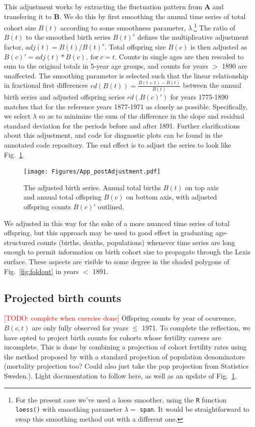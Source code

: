 \documentclass{article}
\renewcommand{\todo}[1]{\textcolor{red}{[TODO: #1]}}
\begin{document}
\begin{appendix}
This adjustment works by extracting the fluctuation pattern from \textbf{A} and transfering it to \textbf{B}. We do this by first smoothing the annual time series of total cohort size $B(t)$ according to some smoothness parameter, $\lambda$.\footnote{For the present case we've used a loess smoother, using the \texttt{R} function \texttt{loess()} with smoothing parameter $\lambda =$ \texttt{span}. It would be straightforward to swap this smoothing method out with a different one.} The ratio of $B(t)$ to the smoothed birth series $B(t)^s$ defines the multiplicative adjustment factor, $adj(t) = B(t)/B(t)^s$. Total offspring size $B(c)$ is then adjusted as $B(c)' = adj(t)*B(c), \mathrm{~for~} c = t$. Counts in single ages are then rescaled to sum to the original totals in 5-year age groups, and counts for years $>$ 1890 are unaffected. The smoothing parameter is selected such that the linear relationship in fractional first differences $rd(B(t)) = \frac{B(t+1)-B(t)}{B(t)}$ between the annual birth series and adjusted offspring series $rd(B(c)')$ for years 1775-1890 matches that for the reference years 1877-1971 as closely as possible. Specifically, we select $\lambda$ so as to minimize the sum of the difference in the slope and residual standard deviation for the periods before and after 1891. Further clarifications about this adjustment, and code for diagnostic plots can be found in the annotated code repository. The end effect is to adjust the series to look like Fig.~\ref{fig:better}.

\begin{figure}[ht!]
\centering
 \texttt{[image: Figures/App\_postAdjustment.pdf]}
\caption{The adjusted birth series. Annual total births $B(t)$ on top axis and annual total offspring $B(c)$ on bottom axis, with adjusted offspring counts $B(c)'$ outlined.}
\label{fig:better}
\end{figure}
\end{appendix}

We adjusted in this way for the sake of a more nuanced time series of total offspring, but this approach may be used to good effect in graduating age-structured counts (births, deaths, populations) whenever time series are long enough to permit information on birth cohort size to propagate through the Lexis surface. These aspects are visible to some degree in the shaded polygons of Fig.~\ref{fig:foldout} in years $<$ 1891.

\subsection{Projected birth counts}
\todo{complete when exercise done}
Offspring counts by year of ocurrence, $B(c,t)$ are only fully observed for years $\le$ 1971. To complete the reflection, we have opted to project birth counts for cohorts whose fertility careers are incomplete. This is done by combining a projection of cohort fertility rates using the method proposed by \citet{de1985time} with a standard projection of population denominators (mortality projection too? Could also just take the pop projection from Statistics Sweden.). Light documentation to follow here, as well as an update of Fig.~\ref{fig:better}.
\end{document}

